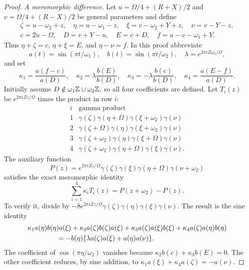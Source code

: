 \begin{proof}
\emph{A meromorphic difference.}
Let $u=\Omega/4+(R+X)/2$ and
$v=\Omega/4+(R-X)/2$ be general parameters and define
\begin{gather*}
 \zeta=u-\omega_2+z,\quad \eta=u-\omega_1-z,\quad
 \xi=v-\omega_2+Y+z,\quad \nu=v-Y-z,\\
 c=2u-\Omega,\quad D=v+Y-u,\quad E=c+D,\quad
 f=u-v-\omega_1+Y.
\end{gather*}
Thus $\eta+\zeta=c$, $\eta+\xi=E$, and $\eta-\nu=f$.
In this proof abbreviate
\[
 a(t)=\sin(\pi t/\omega_1),\quad b(t)=\sin(\pi t/\omega_2),\quad
 \lambda=e^{2\pi iZ\omega_2/\Omega},
\]
and set
\[
 \kappa_1=\frac{a(f-c)}{a(D)},\quad
 \kappa_2=\lambda\frac{b(E)}{b(D)},\quad
 \kappa_3=-\lambda\frac{b(c)}{b(D)},\quad
 \kappa_4=\frac{a(E-f)}{a(D)}.
\]
Initially assume $D\notin\omega_1\mathbb Z\cup\omega_2\mathbb Z$, so all four
coefficients are defined.
Let $T_i(z)$ be $e^{2\pi iZz/\Omega}$ times the product in row $i$:
\[
\begin{array}{c|l}
 i&\text{gamma product}\\\hline
 1&\gamma(\zeta)\gamma(\eta+\Omega)\gamma(\xi+\omega_2)\gamma(\nu)\\
 2&\gamma(\zeta+\Omega)\gamma(\eta)\gamma(\xi+\omega_2)\gamma(\nu)\\
 3&\gamma(\zeta+\omega_2)\gamma(\eta)\gamma(\xi+\Omega)\gamma(\nu)\\
 4&\gamma(\zeta+\omega_2)\gamma(\eta+\Omega)\gamma(\xi)\gamma(\nu).
\end{array}
\]
The auxiliary function
\[
 P(z)=e^{2\pi iZz/\Omega}
       \gamma(\zeta)\gamma(\xi)\gamma(\eta+\Omega)\gamma(\nu+\omega_2)
\]
satisfies the exact meromorphic identity
\begin{equation}
 \sum_{i=1}^4\kappa_iT_i(z)=P(z+\omega_2)-P(z).
 \label{an:primitive}
\end{equation}
To verify it, divide by
$-8e^{2\pi iZz/\Omega}\gamma(\zeta)\gamma(\eta)
\gamma(\xi)\gamma(\nu)$.  The result is the sine identity
\begin{align*}
 &\kappa_1a(\eta)b(\eta)a(\xi)
 +\kappa_2a(\zeta)b(\zeta)a(\xi)
 +\kappa_3a(\zeta)a(\xi)b(\xi)
 +\kappa_4a(\zeta)a(\eta)b(\eta)\\
 &\hspace{15mm}=-b(\eta)
             \{\lambda a(\zeta)a(\xi)+a(\eta)a(\nu)\}.
\end{align*}
The coefficient of $\cos(\pi\eta/\omega_2)$ vanishes because
$\kappa_2b(c)+\kappa_3b(E)=0$.  The other coefficient reduces,
by sine addition, to
$\kappa_1a(\xi)+\kappa_4a(\zeta)=-a(\nu)$.


\end{proof}

